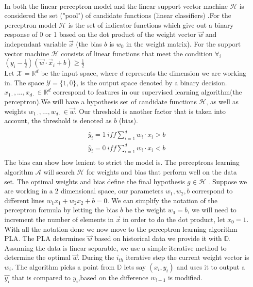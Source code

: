 \documentclass[12pt]{article}
\begin{document}

\begin{enumerate}

\\
In both the linear perceptron model and the linear support vector machine $\mathcal{H}$ is considered the set ("pool") of candidate functions (linear classifiers) .For the perceptron model $ \mathcal{H}$ is the set of indicator functions which give out a binary response of 0 or 1 based on the dot product of the weight vector $\vec{w}$ and independant variable $\vec{x}$ (the bias $b$ is $w_{0}$ in the weight matrix). For the support vector machine $\mathcal{H}$ consists of linear functions that meet the condition  $\forall_i$ $(y_i-\frac{1}{2})(\vec{w}\cdot\vec{x}_{i} + b)\geq \frac{1}{2}$
\\Let $\mathcal{X} = \mathbb{R}^d$ be the input space, where $d$ represents the dimension we are working in. The space $\mathcal{Y} = \{ 1,0\}$, is the output space denoted by a binary decision. $x_{1 \cdot}, \ldots, x_{d\cdot} \in \mathbb{R}^d $ correspond to features in our supervised learning algorithm(the perceptron).We will  have a hypothesis set of candidate functions $\mathcal{H}$, as well as weights $w_{1 \cdot}, \ldots, w_{d\cdot} \in \vec{w}$.  Our threshold is another factor that is taken into account, the threshold is denoted as $b$ (bias). 
\begin{eqnarray*}\\
\hat y_{i}=1 \ iff  \sum_{i=1}^{d}  w_{i} \cdot x_{i}  > b \\
\hat y_{i}=0  \ iff  \sum_{i=1}^{d}  w_{i} \cdot x_{i}  < b \\
\end{eqnarray*}
The bias can show how lenient to strict the model is. The perceptrons learning algorithm $\mathcal{A}$ will search $\mathcal{H}$ for weights and bias that perform well on the data set. The optimal weights and bias define the final hypothesis $g \in \mathcal{H} $ . Suppose we are working in a 2 dimensional space, our parameters $w_{1}, w_{2}, b$ correspond to different lines $w_{1}x_{1} + w_{2}x_{2} + b= 0$. We can simplify the notation of the perceptron formula by letting the bias $b$ be the weight $w_{0} = b$, we will need to increment the number of elements in $\vec{x}$ in order to do the dot product, let $x_{0} = 1$. With all the notation done we now move to the perceptron learning algorithm PLA. The PLA determines $\vec{w}$ based on historical data we provide it with $\mathbb{D}$.  Assuming the data is linear separable, we use a simple iterative method to determine the optimal $\vec{w}$. During the $i_{th}$ iterative step the current weight vector is $w_{i}$. The algorithm picks a point from $\mathbb{D}$ lets say $(x_{i} , y_{i})$ and uses it to output a $\hat{y_{i}}$ that is compared to $y_i$,based on the difference $w_{i+1}$ is modified.

\end{enumerate}
\end{document}
